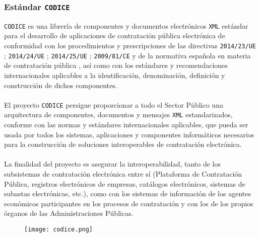         \subsubsection{Estándar \texttt{CODICE}}
            \texttt{CODICE} es una librería de componentes y documentos electrónicos \texttt{XML} estándar para el desarrollo de aplicaciones de contratación pública electrónica de conformidad con los procedimientos y prescripciones de las directivas \texttt{2014/23/UE} \cite{UE201423}; \texttt{2014/24/UE} \cite{UE201424}; \texttt{2014/25/UE} \cite{UE201425}; \texttt{2009/81/CE} \cite{UE200981} y de la normativa española en materia de contratación pública \cite{BOE20179}, así como con los estándares y recomendaciones internacionales aplicables a la identificación, denominación, definición y construcción de dichos componentes.
            \\ \\
            El proyecto \texttt{CODICE} persigue proporcionar a todo el Sector Público una arquitectura de componentes, documentos y mensajes \texttt{XML} estandarizados, conforme con las normas y estándares internacionales aplicables, que pueda ser usada por todos los sistemas, aplicaciones y componentes informáticos necesarios para la construcción de soluciones interoperables de contratación electrónica.
            \\ \\
            La finalidad del proyecto es asegurar la interoperabilidad, tanto de los subsistemas de contratación electrónica entre sí (Plataforma de Contratación Pública, registros electrónicos de empresas, catálogos electrónicos, sistemas de subastas electrónicas, etc.), como con los sistemas de información de los agentes económicos participantes en los procesos de contratación y con los de los propios órganos de las Administraciones Públicas.
            \\
        
            \begin{figure}[h]
                \centering
                \texttt{[image: codice.png]}
            \end{figure}
            
